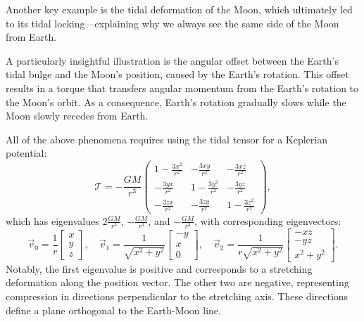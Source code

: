             Another key example is the tidal deformation of the Moon, which ultimately led to its tidal locking—explaining why we always see the same side of the Moon from Earth.

            A particularly insightful illustration is the angular offset between the Earth's tidal bulge and the Moon's position, caused by the Earth's rotation. This offset results in a torque that transfers angular momentum from the Earth's rotation to the Moon's orbit. As a consequence, Earth's rotation gradually slows while the Moon slowly recedes from Earth. 
            
            All of the above phenomena requires using the tidal tensor for a Keplerian potential:
            \begin{equation}
                \mathcal{T}= -\frac{GM}{r^3}\left(\begin{matrix}
                    1-\frac{3x^2}{r^2} & -\frac{3xy}{r^2} & -\frac{3xz}{r^2} \\
                    -\frac{3yx}{r^2} & 1-\frac{3y^2}{r^2} & -\frac{3yz}{r^2} \\
                    -\frac{3zx}{r^2} & -\frac{3zy}{r^2} & 1-\frac{3z^2}{r^2}
                \end{matrix}\right),
            \end{equation}
            which has eigenvalues $2\frac{GM}{r^3}$, $-\frac{GM}{r^3}$, and $-\frac{GM}{r^3}$, with corresponding eigenvectors:
            \begin{equation}
                \vec{v}_0 = \dfrac{1}{r}\begin{bmatrix} x \\ y \\ z \end{bmatrix},\quad
                \vec{v}_1 = \dfrac{1}{\sqrt{x^2 + y^2}} \begin{bmatrix} -y \\ x \\ 0 \end{bmatrix},\quad
                \vec{v}_2 = \dfrac{1}{r\sqrt{x^2 + y^2}} \begin{bmatrix} -xz \\ -yz \\ x^2 + y^2 \end{bmatrix}.
            \end{equation}
            Notably, the first eigenvalue is positive and corresponds to a stretching deformation along the position vector. The other two are negative, representing compression in directions perpendicular to the stretching axis. These directions define a plane orthogonal to the Earth-Moon line. 
            
